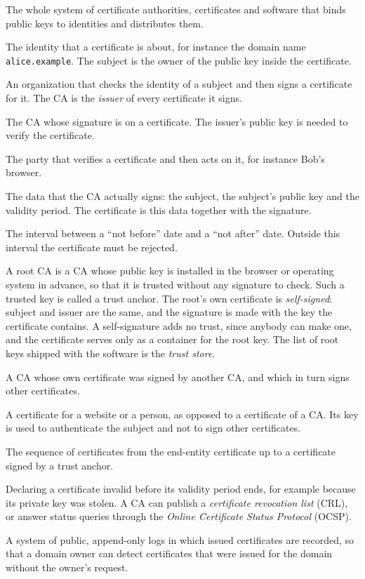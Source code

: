 \documentclass[11pt,a4paper]{article}
\theoremstyle{definition}
\begin{document}
\begin{description}[itemsep=0.4em]
\item[Public key infrastructure (PKI).] The whole system of certificate authorities, certificates and software that binds public keys to identities and distributes them.
\item[Subject.] The identity that a certificate is about, for instance the domain name \texttt{alice.example}. The subject is the owner of the public key inside the certificate.
\item[Certificate authority (CA).] An organization that checks the identity of a subject and then signs a certificate for it. The CA is the \emph{issuer} of every certificate it signs.
\item[Issuer.] The CA whose signature is on a certificate. The issuer's public key is needed to verify the certificate.
\item[Relying party.] The party that verifies a certificate and then acts on it, for instance Bob's browser.
\item[To-be-signed part (tbs).] The data that the CA actually signs: the subject, the subject's public key and the validity period. The certificate is this data together with the signature.
\item[Validity period.] The interval between a ``not before'' date and a ``not after'' date. Outside this interval the certificate must be rejected.
\item[Root CA and trust anchor.] A root CA is a CA whose public key is installed in the browser or operating system in advance, so that it is trusted without any signature to check. Such a trusted key is called a trust anchor. The root's own certificate is \emph{self-signed}: subject and issuer are the same, and the signature is made with the key the certificate contains. A self-signature adds no trust, since anybody can make one, and the certificate serves only as a container for the root key. The list of root keys shipped with the software is the \emph{trust store}.
\item[Intermediate CA.] A CA whose own certificate was signed by another CA, and which in turn signs other certificates.
\item[End-entity (leaf) certificate.] A certificate for a website or a person, as opposed to a certificate of a CA. Its key is used to authenticate the subject and not to sign other certificates.
\item[Certificate chain (certification path).] The sequence of certificates from the end-entity certificate up to a certificate signed by a trust anchor.
\item[Revocation.] Declaring a certificate invalid before its validity period ends, for example because its private key was stolen. A CA can publish a \emph{certificate revocation list} (CRL), or answer status queries through the \emph{Online Certificate Status Protocol} (OCSP).
\item[Certificate transparency.] A system of public, append-only logs in which issued certificates are recorded, so that a domain owner can detect certificates that were issued for the domain without the owner's request.
\end{description}
\end{document}
